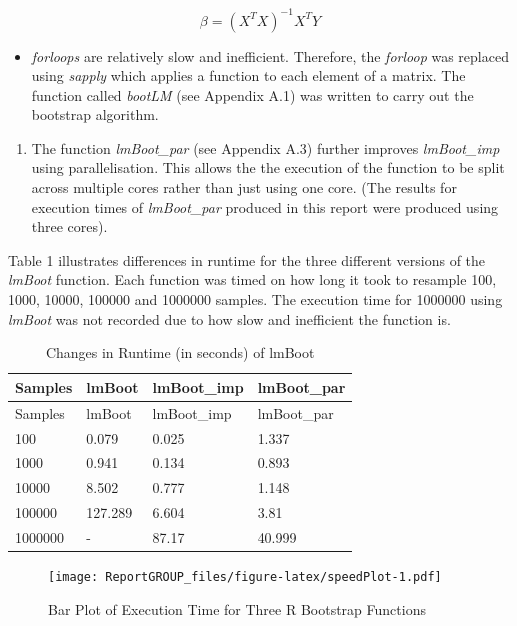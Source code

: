 \documentclass[]{article}
\providecommand{\tightlist}{%
  \setlength{\itemsep}{0pt}\setlength{\parskip}{0pt}}
\begin{document}
\[
\beta = (X^TX)^{-1}X^TY
\]

\begin{itemize}
\tightlist
\item
  \emph{forloops} are relatively slow and inefficient. Therefore, the
  \emph{forloop} was replaced using \emph{sapply} which applies a
  function to each element of a matrix. The function called
  \emph{bootLM} (see Appendix A.1) was written to carry out the
  bootstrap algorithm.
\end{itemize}

\begin{enumerate}
\def\labelenumi{\arabic{enumi}.}
\setcounter{enumi}{1}
\tightlist
\item
  The function \emph{lmBoot\_par} (see Appendix A.3) further improves
  \emph{lmBoot\_imp} using parallelisation. This allows the the
  execution of the function to be split across multiple cores rather
  than just using one core. (The results for execution times of
  \emph{lmBoot\_par} produced in this report were produced using three
  cores).
\end{enumerate}

Table 1 illustrates differences in runtime for the three different
versions of the \emph{lmBoot} function. Each function was timed on how
long it took to resample 100, 1000, 10000, 100000 and 1000000 samples.
The execution time for 1000000 using \emph{lmBoot} was not recorded due
to how slow and inefficient the function is.

\begin{longtable}[]{@{}llll@{}}
\caption{Changes in Runtime (in seconds) of lmBoot}\tabularnewline
\toprule
Samples & lmBoot & lmBoot\_imp & lmBoot\_par\tabularnewline
\midrule
\endfirsthead
\toprule
Samples & lmBoot & lmBoot\_imp & lmBoot\_par\tabularnewline
\midrule
\endhead
100 & 0.079 & 0.025 & 1.337\tabularnewline
1000 & 0.941 & 0.134 & 0.893\tabularnewline
10000 & 8.502 & 0.777 & 1.148\tabularnewline
100000 & 127.289 & 6.604 & 3.81\tabularnewline
1000000 & - & 87.17 & 40.999\tabularnewline
\bottomrule
\end{longtable}

\begin{figure}
\centering
\texttt{[image: ReportGROUP\_files/figure-latex/speedPlot-1.pdf]}
\caption{\label{fig:speedPlot} Bar Plot of Execution Time for Three R
Bootstrap Functions}
\end{figure}

\pagebreak
\end{document}
